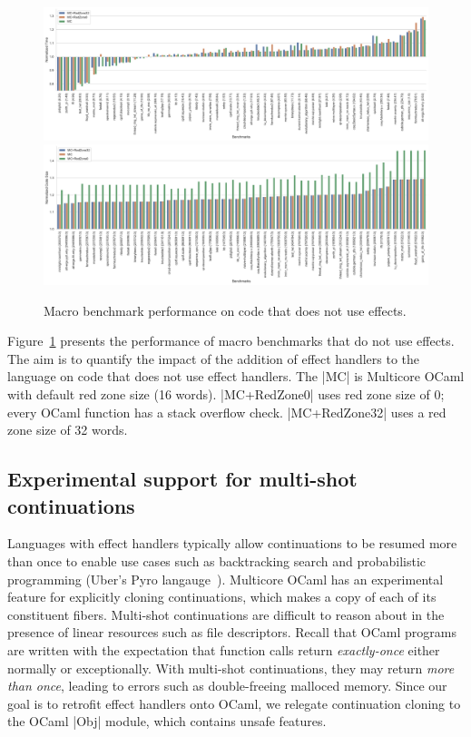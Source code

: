 \documentclass[sigplan,10pt,review,anonymous]{acmart}\settopmatter{printfolios=true,printccs=false,printacmref=false}
\begin{document}
\begin{figure}
	\begin{minipage}{\linewidth}
	\includegraphics[width=\linewidth]{sandmark-notebook/sandmark_time}
	\includegraphics[width=\linewidth]{sandmark-notebook/sandmark_codesize}
	\end{minipage}
	\caption{Macro benchmark performance on code that does not use effects.}
	\label{res:macro}
\end{figure}

Figure~\ref{res:macro} presents the performance of macro benchmarks that do not
use effects. The aim is to quantify the impact of the addition of effect
handlers to the language on code that does not use effect handlers. The |MC| is
Multicore OCaml with default red zone size (16 words). |MC+RedZone0| uses red
zone size of 0; every OCaml function has a stack overflow check. |MC+RedZone32|
uses a red zone size of 32 words.

\subsection*{Experimental support for multi-shot continuations}

Languages with effect handlers typically allow continuations to be resumed more
than once to enable use cases such as backtracking search and probabilistic
programming (Uber's Pyro langauge~\cite{Pyro}). Multicore OCaml has an
experimental feature for explicitly cloning continuations, which makes a copy
of each of its constituent fibers. Multi-shot continuations are difficult to
reason about in the presence of linear resources such as file descriptors.
Recall that OCaml programs are written with the expectation that function calls
return \emph{exactly-once} either normally or exceptionally. With multi-shot
continuations, they may return \emph{more than once}, leading to errors such as
double-freeing malloced memory. Since our goal is to retrofit effect handlers
onto OCaml, we relegate continuation cloning to the OCaml |Obj| module, which
contains unsafe features.
\end{document}
